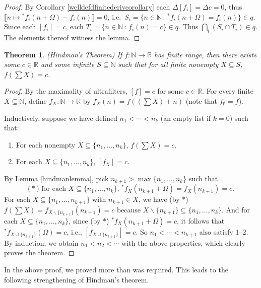 \documentclass[microtype]{jloganal}
\newtheorem{theorem}{Theorem}
\begin{document}
\begin{proof}
    By Corollary \ref{welldefdfinitederivcorollary}
    each $\Delta[f_i]=\Delta c=0$, thus
    $\llbracket n\mapsto {}^*f_i(n+\Omega)-f_i(n)\rrbracket=0$,
    i.e.\ $S_i=\{n\in\mathbb N\,:\,{}^*f_i(n+\Omega)=f_i(n)\}\in q$.
    Since each $[f_i]=c$, each $T_i=\{n\in\mathbb N\,:\,f_i(n)=c\}\in q$.
    Thus $\bigcap_i (S_i\cap T_i)\in q$. The elements thereof witness the lemma.
\end{proof}

\begin{theorem}
\label{hindmanthm}
    (Hindman's Theorem)
    If $f:\mathbb N\to\mathbb R$ has finite range,
    then there exists some $c\in \mathbb R$
    and some infinite $S\subseteq \mathbb N$
    such that for all finite nonempty $X\subseteq S$,
    $f(\sum X)=c$.
\end{theorem}

\begin{proof}
    By the maximality of
    ultrafilters, $[f]=c$ for some $c\in\mathbb R$.
    For every finite $X\subseteq \mathbb N$,
    define $f_X:\mathbb N\to\mathbb R$ by $f_X(n)=f((\sum X)+n)$
    (note that $f_\emptyset=f$).

    Inductively, suppose we have defined
    $n_1<\cdots<n_k$ (an empty list if $k=0$) such that:
    \begin{enumerate}
        \item
        For each nonempty $X\subseteq\{n_1,\ldots,n_k\}$,
        $f(\sum X)=c$.
        \item
        For each $X\subseteq\{n_1,\ldots,n_k\}$, $[f_X]=c$.
    \end{enumerate}
    By Lemma \ref{hindmanlemma}, pick $n_{k+1}>\max\{n_1,\ldots,n_k\}$
    such that
    \[
    \mbox{($*$) for each $X\subseteq \{n_1,\ldots,n_k\}$,
    ${}^*f_X(n_{k+1}+\Omega)=f_X(n_{k+1})=c$.}
    \]
    For each $X\subseteq\{n_1,\ldots,n_{k+1}\}$
    with $n_{k+1}\in X$, we have (by $*$)
    $f(\sum X)=f_{X\backslash \{n_{k+1}\}}(n_{k+1})=c$
    because $X\backslash\{n_{k+1}\}\subseteq\{n_1,\ldots,n_k\}$.
    And for each $X\subseteq\{n_1,\ldots,n_k\}$,
    since (by $*$) ${}^*f_X(n_{k+1}+\Omega)=c$, it follows that
    ${}^*f_{X\cup\{n_{k+1}\}}(\Omega)=c$, i.e.,
    $[f_{X\cup\{n_{k+1}\}}]=c$. So ${n_1<\cdots<n_{k+1}}$ also
    satisfy 1--2. By induction, we obtain $n_1<n_2<\cdots$
    with the above properties, which clearly proves the theorem.
\end{proof}

In the above proof, we proved more than was required. This leads to
the following strengthening of Hindman's theorem.
\end{document}
